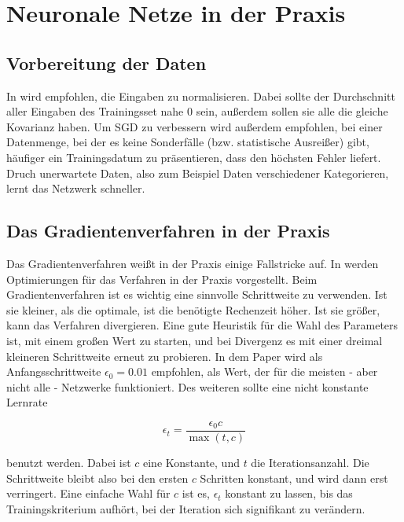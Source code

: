 \section{Neuronale Netze in der Praxis}

\subsection{Vorbereitung der Daten}
In \cite{lecunefficient} wird empfohlen, die Eingaben zu normalisieren.
Dabei sollte der Durchschnitt aller Eingaben des Trainingsset nahe $0$ sein, außerdem sollen sie alle die gleiche Kovarianz haben.
Um SGD zu verbessern wird außerdem empfohlen, bei einer Datenmenge, bei der es keine Sonderfälle (bzw. statistische Ausreißer) gibt, häufiger ein Trainingsdatum zu präsentieren, dass den höchsten Fehler liefert. Druch unerwartete Daten, also zum Beispiel Daten verschiedener Kategorieren, lernt das Netzwerk schneller.

\subsection{Das Gradientenverfahren in der Praxis}
Das Gradientenverfahren weißt in der Praxis einige Fallstricke auf. In \cite{bengio2012practical} werden Optimierungen für das Verfahren in der Praxis vorgestellt. 
Beim Gradientenverfahren ist es wichtig eine sinnvolle Schrittweite zu verwenden. Ist sie kleiner, als die optimale, ist die benötigte Rechenzeit höher. Ist sie größer, kann das Verfahren divergieren. Eine gute Heuristik für die Wahl des Parameters ist, mit einem großen Wert zu starten, und bei Divergenz es mit einer dreimal kleineren Schrittweite erneut zu probieren.
In dem Paper wird als Anfangsschrittweite $\epsilon_0 = 0.01$ empfohlen, als Wert, der für die meisten - aber nicht alle - Netzwerke funktioniert.
Des weiteren sollte eine nicht konstante Lernrate 

\begin{equation}
	\epsilon_t = \frac{\epsilon_0 c}{\max(t, c)}
\end{equation}

benutzt werden. Dabei ist $c$ eine Konstante, und $t$ die Iterationsanzahl. Die Schrittweite bleibt also bei den ersten $c$ Schritten konstant, und wird dann erst verringert. Eine einfache Wahl für $c$ ist es, $\epsilon_t$ konstant zu lassen, bis das Trainingskriterium aufhört, bei der Iteration sich signifikant zu verändern.


